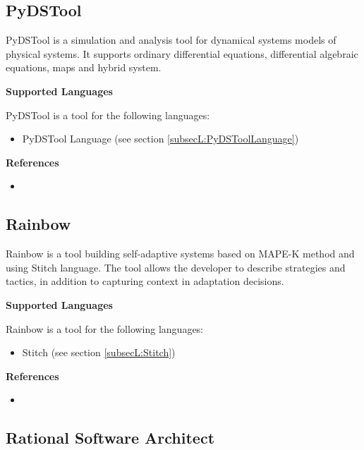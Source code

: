 \subsection{PyDSTool}
\label{subsecT:PyDSTool}


PyDSTool is a simulation and analysis tool for dynamical systems models of physical systems. It supports ordinary differential equations, differential algebraic equations, maps and hybrid system.

\textbf{Supported Languages}

PyDSTool is a tool for the following languages:
\begin{itemize}
	\item PyDSTool Language (see section \ref{subsecL:PyDSToolLanguage})
\end{itemize}


\textbf{References}
\begin{itemize}
	
\item {}
\end{itemize}



\subsection{Rainbow}
\label{subsecT:Rainbow}


Rainbow is a tool building self-adaptive systems based on MAPE-K method and using Stitch language. The tool allows the developer to describe strategies and tactics, in addition to capturing context in adaptation decisions.

\textbf{Supported Languages}

Rainbow is a tool for the following languages:
\begin{itemize}
	\item Stitch (see section \ref{subsecL:Stitch})
\end{itemize}


\textbf{References}
\begin{itemize}
	
\item {}
\end{itemize}



\subsection{Rational Software Architect}
\label{subsecT:RationalSoftwareArchitect}


